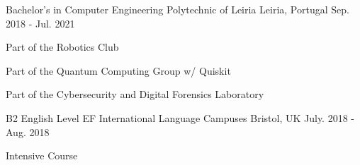 

\begin{cventries}

\cventry
    {Bachelor's in Computer Engineering} %
    {Polytechnic of Leiria} %
    {Leiria, Portugal} %
    {Sep. 2018 - Jul. 2021} %
    {
      \begin{cvitems} %
        \item {Part of the Robotics Club}
        \item {Part of the Quantum Computing Group w/ Quiskit}
        \item {Part of the Cybersecurity and Digital Forensics Laboratory}
      \end{cvitems}
    }

\cventry
    {B2 English Level} %
    {EF International Language Campuses} %
    {Bristol, UK} %
    {July. 2018 - Aug. 2018} %
    {
        \begin{cvitems} %
        \item {Intensive Course}
      \end{cvitems}
    }

\end{cventries}
